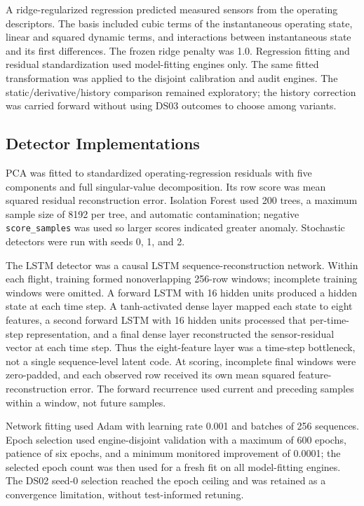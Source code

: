 \documentclass[10pt,twocolumn]{article}
\begin{document}
A ridge-regularized regression predicted measured sensors from the operating descriptors. The basis included cubic terms of the instantaneous operating state, linear and squared dynamic terms, and interactions between instantaneous state and its first differences. The frozen ridge penalty was 1.0. Regression fitting and residual standardization used model-fitting engines only. The same fitted transformation was applied to the disjoint calibration and audit engines. The static/derivative/history comparison remained exploratory; the history correction was carried forward without using DS03 outcomes to choose among variants.

\subsection{Detector Implementations}\label{detector-implementations}

PCA was fitted to standardized operating-regression residuals with five components and full singular-value decomposition. Its row score was mean squared residual reconstruction error. Isolation Forest used 200 trees, a maximum sample size of 8192 per tree, and automatic contamination; negative \texttt{score\_samples} was used so larger scores indicated greater anomaly. Stochastic detectors were run with seeds 0, 1, and 2.

The LSTM detector was a causal LSTM sequence-reconstruction network. Within each flight, training formed nonoverlapping 256-row windows; incomplete training windows were omitted. A forward LSTM with 16 hidden units produced a hidden state at each time step. A tanh-activated dense layer mapped each state to eight features, a second forward LSTM with 16 hidden units processed that per-time-step representation, and a final dense layer reconstructed the sensor-residual vector at each time step. Thus the eight-feature layer was a time-step bottleneck, not a single sequence-level latent code. At scoring, incomplete final windows were zero-padded, and each observed row received its own mean squared feature-reconstruction error. The forward recurrence used current and preceding samples within a window, not future samples.

Network fitting used Adam with learning rate 0.001 and batches of 256 sequences. Epoch selection used engine-disjoint validation with a maximum of 600 epochs, patience of six epochs, and a minimum monitored improvement of 0.0001; the selected epoch count was then used for a fresh fit on all model-fitting engines. The DS02 seed-0 selection reached the epoch ceiling and was retained as a convergence limitation, without test-informed retuning.
\end{document}
